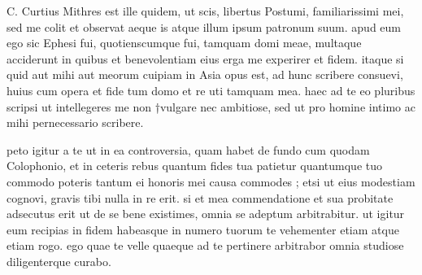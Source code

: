 


 C. Curtius Mithres est ille quidem, ut scis, libertus Postumi, familiarissimi mei, sed me colit et observat aeque is atque illum ipsum patronum suum. apud eum ego sic Ephesi fui, quotienscumque fui, tamquam domi meae, multaque acciderunt in quibus et benevolentiam eius erga me experirer et fidem. itaque si quid aut mihi aut meorum cuipiam in Asia opus est, ad hunc scribere consuevi, huius cum opera et fide tum domo et re uti tamquam mea. haec ad te eo pluribus scripsi ut intellegeres me non †vulgare nec ambitiose, sed ut pro homine intimo ac mihi pernecessario scribere.

 peto igitur a te ut in ea controversia, quam habet de fundo cum quodam Colophonio, et in ceteris rebus quantum fides tua patietur quantumque tuo commodo poteris tantum ei honoris mei causa commodes ; etsi ut eius modestiam cognovi, gravis tibi nulla in re erit. si et mea commendatione et sua probitate adsecutus erit ut de se bene existimes, omnia se adeptum arbitrabitur. ut igitur eum recipias in fidem habeasque in numero tuorum te vehementer etiam atque etiam rogo. ego quae te velle quaeque ad te pertinere arbitrabor omnia studiose diligenterque curabo.
